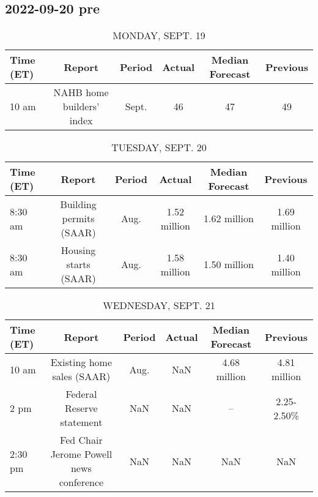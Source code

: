 \documentclass{book}
\begin{document}
  
  

  
  \subsection{ 2022-09-20 pre }
  \normalsize%
  
  
  \begin{table}[htbp]%
  \caption{MONDAY, SEPT. 19}%
  \centering%
  \begin{adjustbox}{width=1\textwidth}%
  \begin{tabular}{lccccc}
  \toprule
  Time (ET) &                    Report & Period & Actual & Median Forecast & Previous \\
  \midrule
      10 am & NAHB home builders' index &  Sept. &     46 &              47 &       49 \\
  \bottomrule
  \end{tabular}
  \end{adjustbox}%
  \end{table}
  
  
  
  \begin{table}[htbp]%
  \caption{TUESDAY, SEPT. 20}%
  \centering%
  \begin{adjustbox}{width=1\textwidth}%
  \begin{tabular}{lccccc}
  \toprule
  Time (ET) &                  Report & Period &       Actual & Median Forecast &     Previous \\
  \midrule
    8:30 am & Building permits (SAAR) &   Aug. & 1.52 million &    1.62 million & 1.69 million \\
    8:30 am &   Housing starts (SAAR) &   Aug. & 1.58 million &    1.50 million & 1.40 million \\
  \bottomrule
  \end{tabular}
  \end{adjustbox}%
  \end{table}
  
  
  
  \begin{table}[htbp]%
  \caption{WEDNESDAY, SEPT. 21}%
  \centering%
  \begin{adjustbox}{width=1\textwidth}%
  \begin{tabular}{lccccc}
  \toprule
  Time (ET) &                                  Report & Period & Actual & Median Forecast &     Previous \\
  \midrule
      10 am &              Existing home sales (SAAR) &   Aug. &    NaN &    4.68 million & 4.81 million \\
       2 pm &               Federal Reserve statement &    NaN &    NaN &              -- &   2.25-2.50\% \\
    2:30 pm & Fed Chair Jerome Powell news conference &    NaN &    NaN &             NaN &          NaN \\
  \bottomrule
  \end{tabular}
  \end{adjustbox}%
  \end{table}
  
\end{document}
